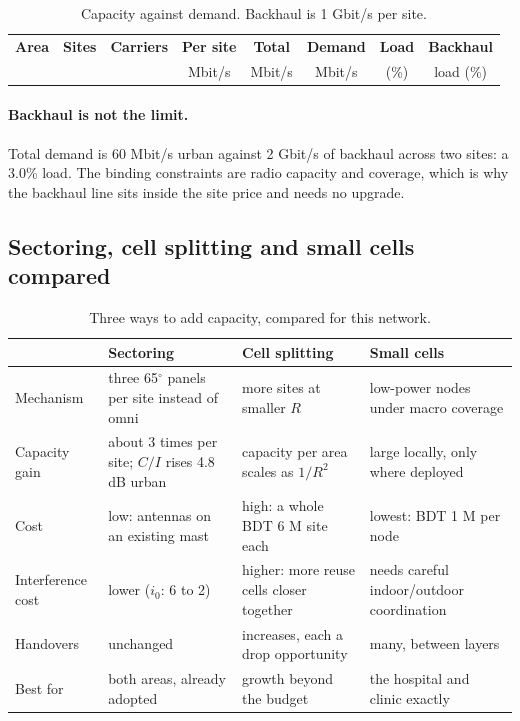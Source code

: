 \documentclass[9pt,a4paper]{article}
\begin{document}
\begin{table}[H]\centering\small
\caption{Capacity against demand. Backhaul is 1 Gbit/s per site.}
\label{tab:cap}
\begin{tabular}{@{}lccccccc@{}}
\toprule
\textbf{Area} & \textbf{Sites} & \textbf{Carriers} & \textbf{Per site} & \textbf{Total} &
\textbf{Demand} & \textbf{Load} & \textbf{Backhaul} \\
& & & Mbit/s & Mbit/s & Mbit/s & (\%) & load (\%) \\
\midrule
\bottomrule
\end{tabular}
\end{table}

\paragraph{Backhaul is not the limit.} Total demand is 60 Mbit/s urban against 2 Gbit/s of
backhaul across two sites: a 3.0\% load. The binding constraints are radio capacity and coverage,
which is why the backhaul line sits inside the site price and needs no upgrade.

\subsection{Sectoring, cell splitting and small cells compared}
\begin{table}[H]\centering\small
\caption{Three ways to add capacity, compared for this network.}
\begin{tabularx}{\textwidth}{@{}p{2.4cm}XXX@{}}
\toprule
& \textbf{Sectoring} & \textbf{Cell splitting} & \textbf{Small cells} \\
\midrule
Mechanism & three 65$^\circ$ panels per site instead of omni & more sites at smaller $R$ & low-power nodes under macro coverage \\
Capacity gain & about 3 times per site; $C/I$ rises 4.8 dB urban & capacity per area scales as $1/R^2$ & large locally, only where deployed \\
Cost & low: antennas on an existing mast & high: a whole BDT 6 M site each & lowest: BDT 1 M per node \\
Interference cost & lower ($i_0$: 6 to 2) & higher: more reuse cells closer together & needs careful indoor/outdoor coordination \\
Handovers & unchanged & increases, each a drop opportunity & many, between layers \\
Best for & both areas, already adopted & growth beyond the budget & the hospital and clinic exactly \\
\bottomrule
\end{tabularx}
\end{table}
\end{document}
